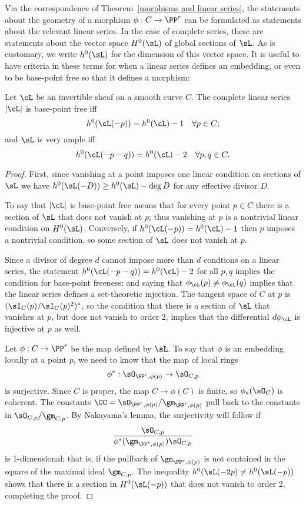 Via the correspondence of Theorem~\ref{morphisms and linear series}, the statements about the geometry of a morphism $\phi : C \to \PP^r$ can be formulated as statements about the relevant linear series. In the case of complete series, these are statements about the vector space $H^{0}(\sL)$ of global sections of $\sL$. As is customary, we write $h^{0}(\sL)$ for the dimension of this vector space. It is useful to have criteria
in these terms for when a linear series defines an embedding, or even to be base-point free so that it
defines a morphism:

\begin{proposition}\label{very ample}\cite[Thm. IV.3.1]{H}
Let $\cL$ be an invertible sheaf on a smooth curve $C$. The complete linear series $|\cL|$ is base-point free iff
$$
h^0(\cL(-p)) = h^0(\cL) - 1 \quad \forall p \in C;
$$
and $\sL$ is very ample iff
$$
h^0(\cL(-p-q)) = h^0(\cL) - 2 \quad \forall p, q \in C.
$$
\end{proposition} 

\begin{proof}
First, since vanishing at a point imposes one linear condition on sections of $\sL$ we have $h^0(\sL(-D)) \geq h^0(\sL)-\deg D$ for any
effective divisor $D$.

To say that $|\cL|$ is base-point free means that for every point $p\in C$ there is a section of $\sL$ that does not vanish at $p$; thus vanishing
at $p$ is a nontrivial linear condition on $H^0(\sL)$. Conversely, if $h^0(\cL(-p)) = h^0(\cL) - 1$ then $p$ imposes a nontrivial condition, so
some section of $\sL$ does not vanish at $p$.

Since a divisor of degree $d$ cannot impose more than $d$ condtions on a linear series, the statement $h^0(\cL(-p-q)) = h^0(\cL) - 2$ for all $p, q$ implies the condition for base-point freeness; and saying that $\phi_\cL(p) \neq \phi_\cL(q)$ implies that the linear series defines a set-theoretic injection. The tangent space of $C$ at $p$ is $(\sI_C(p)/\sI_C(p)^2)^*$, so the condition that there is a section of $\sL$ that vanishes at $p$, but does not vanish
to order 2, implies that the differential $d\phi_\cL$ is injective at $p$ as well.

Let $\phi:C \to \PP^r$ be the map defined by $\sL$. To say that $\phi$  is an embedding locally at a point $p$, we need to know that the map of local rings
$$
\phi^*: \sO_{\PP^r,\phi(p)} \to \sO_{C,p} 
$$
is surjective. Since $C$ is proper, the map $C\to \phi(C)$ is finite,
so $\phi_*(\sO_{C})$ is coherent.
 The constants  $\CC =\sO_{\PP^r,\phi(p)}/\gm_{\PP^r,\phi(p)}$ pull back to the constants in
$\sO_{C,p}/\gm_{C,p}$. 
By Nakayama's lemma, the surjectivity will follow if 
$$
\frac{\sO_{C,p}}
{\phi^*(\gm_{\PP^r,\phi(p)})  \sO_{C,p}}
$$
is 1-dimensional; that is, if  the pullback of $\gm_{\PP^r,\phi(p)}$ is not contained in the square of the
maximal ideal $\gm_{C,p}$. The inequality $h^0(\sL(-2p) \neq h^0(\sL(-p))$ shows that there is a 
section in $H^0(\sL(-p))$ that does not vanish to order 2, completing the proof.
\end{proof}


